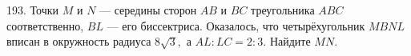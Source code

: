 193. Точки $M$ и $N$ --- середины сторон $AB$ и $BC$ треугольника $ABC$ соответственно, $BL$ --- его биссектриса. Оказалось, что четырёхугольник $MBNL$ вписан в окружность радиуса $8\sqrt{3},$ а $AL:LC=2:3.$ Найдите $MN.$\\

